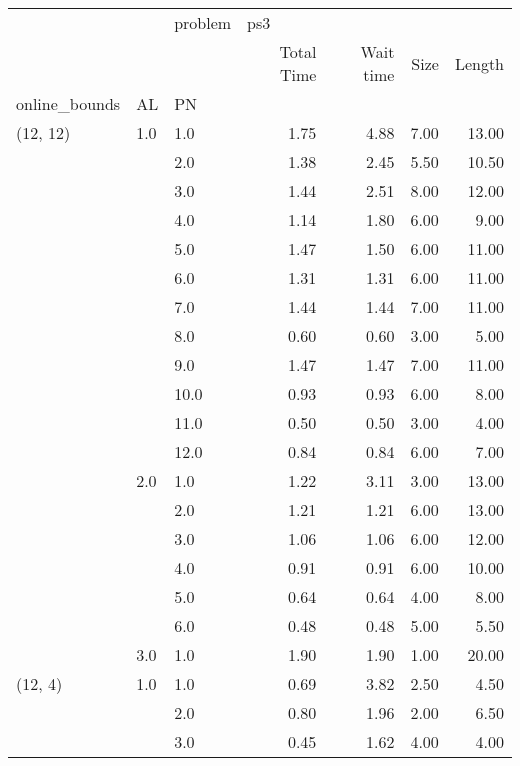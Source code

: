 \begin{tabular}{lllrrrr}
\toprule
       &     & problem & \multicolumn{4}{l}{ps3} \\
       &     & {} & Total Time & Wait time & Size & Length \\
online\_bounds & AL & PN &            &           &      &        \\
\midrule
(12, 12) & 1.0 & 1.0  &       1.75 &      4.88 & 7.00 &  13.00 \\
       &     & 2.0  &       1.38 &      2.45 & 5.50 &  10.50 \\
       &     & 3.0  &       1.44 &      2.51 & 8.00 &  12.00 \\
       &     & 4.0  &       1.14 &      1.80 & 6.00 &   9.00 \\
       &     & 5.0  &       1.47 &      1.50 & 6.00 &  11.00 \\
       &     & 6.0  &       1.31 &      1.31 & 6.00 &  11.00 \\
       &     & 7.0  &       1.44 &      1.44 & 7.00 &  11.00 \\
       &     & 8.0  &       0.60 &      0.60 & 3.00 &   5.00 \\
       &     & 9.0  &       1.47 &      1.47 & 7.00 &  11.00 \\
       &     & 10.0 &       0.93 &      0.93 & 6.00 &   8.00 \\
       &     & 11.0 &       0.50 &      0.50 & 3.00 &   4.00 \\
       &     & 12.0 &       0.84 &      0.84 & 6.00 &   7.00 \\
       & 2.0 & 1.0  &       1.22 &      3.11 & 3.00 &  13.00 \\
       &     & 2.0  &       1.21 &      1.21 & 6.00 &  13.00 \\
       &     & 3.0  &       1.06 &      1.06 & 6.00 &  12.00 \\
       &     & 4.0  &       0.91 &      0.91 & 6.00 &  10.00 \\
       &     & 5.0  &       0.64 &      0.64 & 4.00 &   8.00 \\
       &     & 6.0  &       0.48 &      0.48 & 5.00 &   5.50 \\
       & 3.0 & 1.0  &       1.90 &      1.90 & 1.00 &  20.00 \\
(12, 4) & 1.0 & 1.0  &       0.69 &      3.82 & 2.50 &   4.50 \\
       &     & 2.0  &       0.80 &      1.96 & 2.00 &   6.50 \\
       &     & 3.0  &       0.45 &      1.62 & 4.00 &   4.00 \\

\end{tabular}
